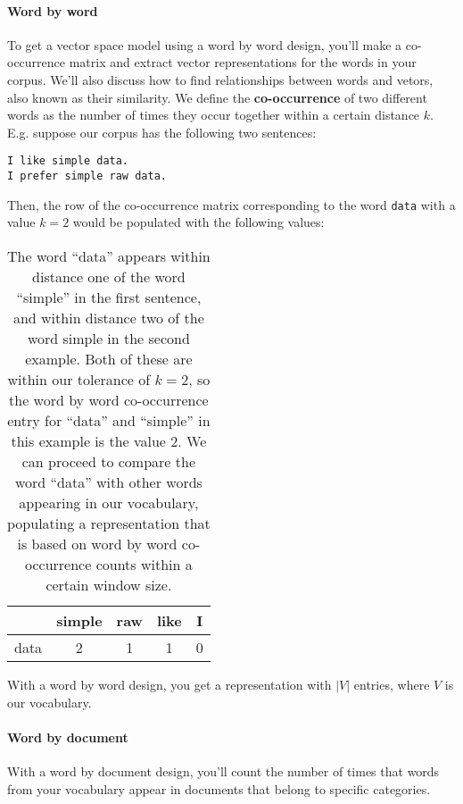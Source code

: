 \documentclass[12pt]{article}
\begin{document}
\paragraph{Word by word} To get a vector space model using a word by word design, you'll make a co-occurrence matrix and extract vector representations for the words in your corpus. We'll also discuss how to find relationships between words and vetors, also known as their similarity. We define the \textbf{co-occurrence} of two different words as the number of times they occur together within a certain distance $k$. E.g. suppose our corpus has the following two sentences:
\begin{verbatim}
I like simple data.
I prefer simple raw data.
\end{verbatim}
Then, the row of the co-occurrence matrix corresponding to the word \texttt{data} with a value $k = 2$ would be populated with the following values:

  \begin{table}[h]
    \begin{center}
      \begin{tabular}{l c c c c}
        & simple & raw & like & I \\
        \hline
        data & 2 & 1 & 1 & 0 \\
        \hline
      \end{tabular}
        \caption{The word ``data'' appears within distance one of the word ``simple'' in the first sentence, and within distance two of the word simple in the second example. Both of these are within our tolerance of $k=2$, so the word by word co-occurrence entry for ``data'' and ``simple'' in this example is the value 2. We can proceed to compare the word ``data'' with other words appearing in our vocabulary, populating a representation that is based on word by word co-occurrence counts within a certain window size.}
  \end{center}
\end{table}

With a word by word design, you get a representation with $|V|$ entries, where $V$ is our vocabulary.

\paragraph{Word by document} With a word by document design, you'll count the number of times that words from your vocabulary appear in documents that belong to specific categories.
\end{document}
